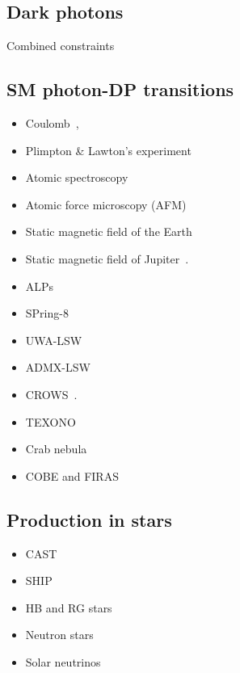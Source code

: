 \documentclass[11pt,twocolumn]{extarticle}
\begin{document}
\begin{mdframed}
\section{Dark photons}\vspace{-0.5em}
Combined constraints~\cite{Caputo:2021eaa}
\subsection*{SM photon-DP transitions}\vspace{-0.5em}
\begin{itemize}\setlength\itemsep{-0.5em}
\item Coulomb~\cite{Goldhaber:2008xy,Williams:1971ms,Bartlett:1988yy,Tu:2005ge,Kroff:2020zhp},
\item Plimpton \& Lawton's experiment~\cite{Plimpton:1936ont,Kroff:2020zhp}
\item Atomic spectroscopy~\cite{Jaeckel:2010xx}
\item Atomic force microscopy (AFM)~\cite{Kroff:2020zhp}
\item Static magnetic field of the Earth~\cite{Goldhaber:1971mr,Fischbach:1994ir,Marocco:2021dku}
\item Static magnetic field of Jupiter~\cite{Davis:1975mn,Marocco:2021dku}. 
\item ALPs~\cite{Ehret:2010mh}
\item SPring-8~\cite{Inada:2013tx}
\item UWA-LSW~\cite{Povey:2010hs,Parker:2013fxa}
\item ADMX-LSW~\cite{Wagner:2010mi}
\item CROWS~\cite{Betz:2013dza}.
\item TEXONO~\cite{Danilov:2018bks}
\item Crab nebula~\cite{Zechlin:2008tj}
\item COBE and FIRAS~\cite{Caputo:2020bdy}
\end{itemize}

\subsection*{Production in stars}\vspace{-0.5em}
\begin{itemize}\setlength\itemsep{-0.5em}
\item CAST~\cite{Redondo:2008aa}
\item SHIP~\cite{Schwarz:2015lqa} 
\item HB and RG stars~\cite{Redondo:2013lna}
\item Neutron stars~\cite{Hong:2020bxo}
\item Solar neutrinos~\cite{Vinyoles:2015aba}
\end{itemize}


\end{mdframed}
\end{document}
